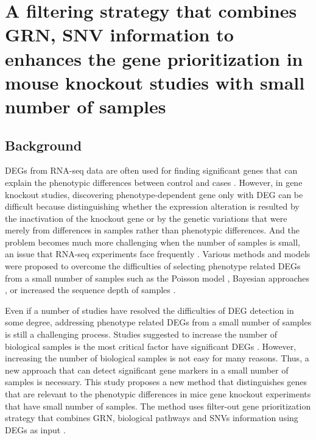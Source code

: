 \documentclass[oneside,phd]{snuthesis}
\begin{document}
\chapter{A filtering strategy that combines GRN, SNV information to enhances the gene prioritization in mouse knockout studies with small number of samples}

\section{Background}

DEGs from RNA-seq data are often used for finding significant genes that can explain the phenotypic differences between control and cases \citep{oshlack2010rna, frazee2014differential}.
However, in gene knockout studies, discovering phenotype-dependent gene only with DEG can be difficult because distinguishing whether the expression alteration is resulted by the inactivation of the knockout gene or by the genetic variations that were merely from differences in samples rather than phenotypic differences.
And the problem becomes much more challenging when the number of samples is small, an issue that RNA-seq experiments face frequently \citep{tarazona2011differential}.
Various methods and models were proposed to overcome the difficulties of selecting phenotype related DEGs from a small number of samples such as the Poisson model \citep{marioni2008rna}, Bayesian approaches \citep{10.1093/nar/gkn705, anders2010differential}, or increased the sequence depth of samples \citep{tarazona2011differential}. 

Even if a number of studies have resolved the difficulties of DEG detection in some degree, addressing phenotype related DEGs from a small number of samples is still a challenging process.
Studies suggested to increase the number of biological samples is the most critical factor have significant DEGs \citep{10.1093/bioinformatics/btt688}.
However, increasing the number of biological samples is not easy for many reasons. 
Thus, a new approach that can detect significant gene markers in
a small number of samples is necessary.
This study proposes a new method that distinguishes genes that are relevant to the phenotypic differences in mice gene knockout experiments that have small number of samples.
The method uses filter-out gene prioritization strategy that combines GRN, biological pathways and SNVs information using DEGs as input \citep{hur2015combined}.
\end{document}
